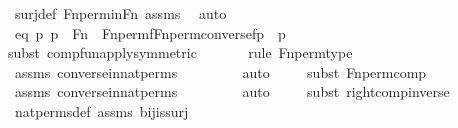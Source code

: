 \begin{isabellebody}
\ surj{\isacharunderscore}{\kern0pt}def\ Fn{\isacharunderscore}{\kern0pt}perm{\isacharunderscore}{\kern0pt}in{\isacharunderscore}{\kern0pt}Fn\ assms\ \isamarkupfalse%
\ auto\isanewline
\isanewline
\ \ \isamarkupfalse%
\ eq{\isacharcolon}{\kern0pt}\ {\isachardoublequoteopen}{\isasymAnd}p{\isachardot}{\kern0pt}\ p\ {\isasymin}\ Fn\ {\isasymLongrightarrow}\ Fn{\isacharunderscore}{\kern0pt}perm{\isacharprime}{\kern0pt}{\isacharparenleft}{\kern0pt}f{\isacharparenright}{\kern0pt}{\isacharbackquote}{\kern0pt}{\isacharparenleft}{\kern0pt}Fn{\isacharunderscore}{\kern0pt}perm{\isacharprime}{\kern0pt}{\isacharparenleft}{\kern0pt}converse{\isacharparenleft}{\kern0pt}f{\isacharparenright}{\kern0pt}{\isacharparenright}{\kern0pt}{\isacharbackquote}{\kern0pt}p{\isacharparenright}{\kern0pt}\ {\isacharequal}{\kern0pt}\ p{\isachardoublequoteclose}\ \isanewline
\ \ \ \ \isamarkupfalse%
{\isacharparenleft}{\kern0pt}subst\ comp{\isacharunderscore}{\kern0pt}fun{\isacharunderscore}{\kern0pt}apply{\isacharbrackleft}{\kern0pt}symmetric{\isacharbrackright}{\kern0pt}{\isacharparenright}{\kern0pt}\isanewline
\ \ \ \ \ \ \isamarkupfalse%
{\isacharparenleft}{\kern0pt}rule\ Fn{\isacharunderscore}{\kern0pt}perm{\isacharprime}{\kern0pt}{\isacharunderscore}{\kern0pt}type{\isacharparenright}{\kern0pt}\isanewline
\ \ \ \ \isamarkupfalse%
\ assms\ converse{\isacharunderscore}{\kern0pt}in{\isacharunderscore}{\kern0pt}nat{\isacharunderscore}{\kern0pt}perms\ \isanewline
\ \ \ \ \ \ \isamarkupfalse%
\ auto{\isacharbrackleft}{\kern0pt}{}{\isacharbrackright}{\kern0pt}\isanewline
\ \ \ \ \isamarkupfalse%
{\isacharparenleft}{\kern0pt}subst\ Fn{\isacharunderscore}{\kern0pt}perm{\isacharprime}{\kern0pt}{\isacharunderscore}{\kern0pt}comp{\isacharparenright}{\kern0pt}\isanewline
\ \ \ \ \isamarkupfalse%
\ assms\ converse{\isacharunderscore}{\kern0pt}in{\isacharunderscore}{\kern0pt}nat{\isacharunderscore}{\kern0pt}perms\ \isanewline
\ \ \ \ \ \ \isamarkupfalse%
\ auto{\isacharbrackleft}{\kern0pt}{}{\isacharbrackright}{\kern0pt}\isanewline
\ \ \ \ \isamarkupfalse%
{\isacharparenleft}{\kern0pt}subst\ right{\isacharunderscore}{\kern0pt}comp{\isacharunderscore}{\kern0pt}inverse{\isacharparenright}{\kern0pt}\isanewline
\ \ \ \ \isamarkupfalse%
\ nat{\isacharunderscore}{\kern0pt}perms{\isacharunderscore}{\kern0pt}def\ assms\ bij{\isacharunderscore}{\kern0pt}is{\isacharunderscore}{\kern0pt}surj\ \isanewline

\end{isabellebody}
